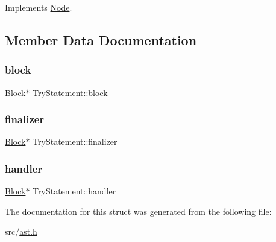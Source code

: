 Implements \hyperlink{struct_node_a82f29420d0a38efcc370352528e94e9b}{Node}.



\subsection{Member Data Documentation}
\mbox{\label{struct_try_statement_aeea1fa5fce0062d0f8d427d4706d1f73}} 
\subsubsection{\texorpdfstring{block}{block}}
{\footnotesize\ttfamily \hyperlink{struct_block}{Block}$\ast$ Try\+Statement\+::block}

\mbox{\label{struct_try_statement_a95cbb6dbd527aad85fa40f0b8b98b66c}} 
\subsubsection{\texorpdfstring{finalizer}{finalizer}}
{\footnotesize\ttfamily \hyperlink{struct_block}{Block}$\ast$ Try\+Statement\+::finalizer}

\mbox{\label{struct_try_statement_a4d97ad90948102f8e6dca2051f03ceb0}} 
\subsubsection{\texorpdfstring{handler}{handler}}
{\footnotesize\ttfamily \hyperlink{struct_block}{Block}$\ast$ Try\+Statement\+::handler}



The documentation for this struct was generated from the following file\+:\begin{DoxyCompactItemize}
\item 
src/\hyperlink{ast_8h}{ast.\+h}\end{DoxyCompactItemize}
